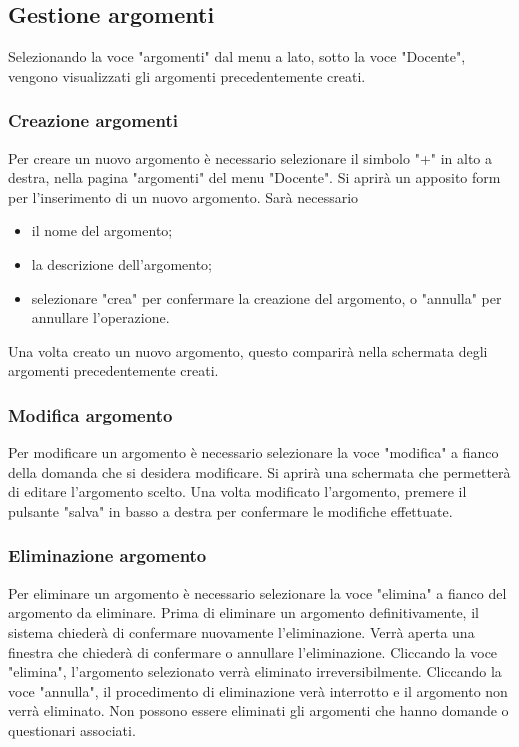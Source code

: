 \documentclass[12pt,a4paper]{article}
\begin{document}
	\subsection{Gestione argomenti}
	Selezionando la voce "argomenti" dal menu a lato, sotto la voce "Docente", vengono visualizzati gli argomenti precedentemente creati.
		\subsubsection{Creazione argomenti}
		Per creare un nuovo argomento è necessario selezionare il simbolo "+" in alto a destra, nella pagina "argomenti" del menu "Docente".
		Si aprirà un apposito form per l'inserimento di un nuovo argomento.
		Sarà necessario 
			\begin{itemize}
			\item il nome del argomento;
			\item la descrizione dell'argomento;
			\item selezionare "crea" per confermare la creazione del argomento, o "annulla" per annullare l'operazione.
		\end{itemize}
		
		Una volta creato un nuovo argomento, questo comparirà nella schermata degli argomenti precedentemente creati.
		
		\subsubsection{Modifica argomento}
		Per modificare un argomento è necessario selezionare la voce "modifica" a fianco della domanda che si desidera modificare. Si aprirà una schermata che permetterà di editare l'argomento scelto.
		Una volta modificato l'argomento, premere il pulsante "salva" in basso a destra per confermare le modifiche effettuate. 
		
		\subsubsection{Eliminazione argomento}
		Per eliminare un argomento è necessario selezionare la voce "elimina" a fianco del argomento da eliminare. Prima di eliminare un argomento definitivamente, il sistema chiederà di confermare nuovamente l'eliminazione.
		Verrà aperta una finestra che chiederà di confermare o annullare l'eliminazione. Cliccando la voce "elimina", l'argomento selezionato verrà eliminato irreversibilmente. Cliccando la voce "annulla", il procedimento di eliminazione verà interrotto e il argomento non verrà eliminato.
		Non possono essere eliminati gli argomenti che hanno domande o questionari associati.
		
\end{document}
